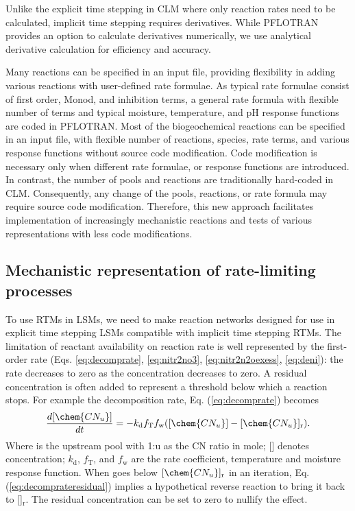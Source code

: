 \documentclass[gmd, manuscript]{copernicus}
\begin{document}
Unlike the explicit time stepping in CLM where only reaction rates need to be
calculated, implicit time stepping requires derivatives.  While PFLOTRAN
provides an option to calculate derivatives numerically, we use analytical
derivative calculation for efficiency and accuracy. 

Many reactions can be specified in an input file, providing flexibility in
adding various reactions with user-defined rate formulae. As typical rate
formulae consist of first order, Monod, and inhibition terms, a general rate
formula with flexible number of terms and typical moisture, temperature, and pH
response functions are coded in PFLOTRAN. Most of the biogeochemical reactions
can be specified in an input file, with flexible number of reactions, species,
rate terms, and various response functions without source code modification.
Code modification is necessary only when different rate formulae, or response
functions are introduced. In contrast, the number of pools and reactions are
traditionally hard-coded in CLM. Consequently, any change of the pools,
reactions, or rate formula may require source code modification. Therefore,
this new approach facilitates implementation of increasingly mechanistic
reactions and tests of various representations with less code modifications.

\subsection{Mechanistic representation of rate-limiting processes}
To use RTMs in LSMs, we need to make reaction networks designed for use in
explicit time stepping LSMs compatible with implicit time stepping RTMs. The
limitation of reactant availability on reaction rate is well represented by the
first-order rate (Eqs. \ref{eq:decomprate}, \ref{eq:nitr2no3},
\ref{eq:nitr2n2oexess}, \ref{eq:deni}): the rate decreases to zero as the
concentration decreases to zero. A residual concentration is often added to
represent a threshold below which a reaction stops. For example the
decomposition rate, Eq. (\ref{eq:decomprate}) becomes
\begin{equation}
\frac{d [\chem{CN_u}]}{d t} = -k_\text{d} f_\text{T} f_\text{w}
([\chem{CN_u}] - [\chem{CN_u}]_\text{r}).
\label{eq:decomprateresidual}
\end{equation}
Where  is the upstream pool with 1:u as the CN ratio in mole; []
denotes concentration; $k_\text{d}$, $f_\text{T}$, and $f_\text{w}$ are the
rate coefficient, temperature and moisture response function. When 
goes below $[\chem{CN_u}]_\text{r}$ in an iteration, Eq.
(\ref{eq:decomprateresidual}) implies a hypothetical reverse reaction to bring
it back to []$_\text{r}$. The residual concentration can be set to
zero to nullify the effect.  
\end{document}
